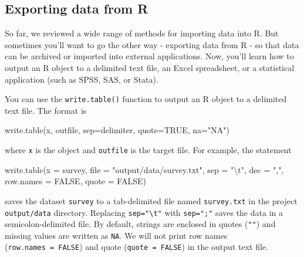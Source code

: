 \documentclass[
]{book}
\newenvironment{Shaded}{\begin{snugshade}}{\end{snugshade}}
\newcommand{\AttributeTok}[1]{\textcolor[rgb]{0.77,0.63,0.00}{#1}}
\newcommand{\ConstantTok}[1]{\textcolor[rgb]{0.00,0.00,0.00}{#1}}
\newcommand{\FunctionTok}[1]{\textcolor[rgb]{0.00,0.00,0.00}{#1}}
\newcommand{\NormalTok}[1]{#1}
\newcommand{\SpecialCharTok}[1]{\textcolor[rgb]{0.00,0.00,0.00}{#1}}
\newcommand{\StringTok}[1]{\textcolor[rgb]{0.31,0.60,0.02}{#1}}
\begin{document}
\hypertarget{exporting-data-from-r}{%
\subsection{Exporting data from R}\label{exporting-data-from-r}}

So far, we reviewed a wide range of methods for importing data into R. But sometimes you'll want to go the other way - exporting data from R - so that data can be archived or imported into external applications. Now, you'll learn how to output an R object to a delimited text file, an Excel spreadsheet, or a statistical application (such as SPSS, SAS, or Stata).

You can use the \texttt{write.table()} function to output an R object to a delimited text file. The format is

\begin{Shaded}
\begin{Highlighting}[]
\FunctionTok{write.table}\NormalTok{(x, outfile, }\AttributeTok{sep=}\NormalTok{delimiter, }\AttributeTok{quote=}\ConstantTok{TRUE}\NormalTok{, }\AttributeTok{na=}\StringTok{"NA"}\NormalTok{)}
\end{Highlighting}
\end{Shaded}

where \texttt{x} is the object and \texttt{outfile} is the target file. For example, the statement

\begin{Shaded}
\begin{Highlighting}[]
\FunctionTok{write.table}\NormalTok{(}\AttributeTok{x =}\NormalTok{ survey, }\AttributeTok{file =} \StringTok{"output/data/survey.txt"}\NormalTok{, }\AttributeTok{sep =} \StringTok{"}\SpecialCharTok{\textbackslash{}t}\StringTok{"}\NormalTok{, }
            \AttributeTok{dec =} \StringTok{","}\NormalTok{, }\AttributeTok{row.names =} \ConstantTok{FALSE}\NormalTok{, }\AttributeTok{quote =} \ConstantTok{FALSE}\NormalTok{)}
\end{Highlighting}
\end{Shaded}

saves the dataset \texttt{survey} to a tab-delimited file named \texttt{survey.txt} in the project \texttt{output/data} directory. Replacing \texttt{sep="\textbackslash{}t"} with \texttt{sep=";"} saves the data in a semicolon-delimited file. By default, strings are enclosed in quotes (\texttt{""}) and missing values are written as \texttt{NA}. We will not print row names (\texttt{row.names\ =\ FALSE}) and quote (\texttt{quote\ =\ FALSE}) in the output text file.
\end{document}
